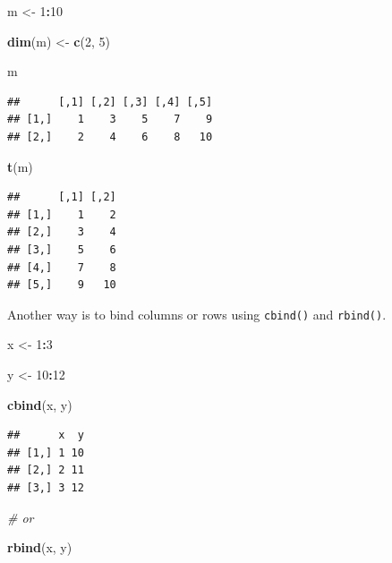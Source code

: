 \documentclass[
]{book}
\newenvironment{Shaded}{\begin{snugshade}}{\end{snugshade}}
\newcommand{\CommentTok}[1]{\textcolor[rgb]{0.56,0.35,0.01}{\textit{#1}}}
\newcommand{\DecValTok}[1]{\textcolor[rgb]{0.00,0.00,0.81}{#1}}
\newcommand{\FunctionTok}[1]{\textcolor[rgb]{0.13,0.29,0.53}{\textbf{#1}}}
\newcommand{\NormalTok}[1]{#1}
\newcommand{\OtherTok}[1]{\textcolor[rgb]{0.56,0.35,0.01}{#1}}
\newcommand{\SpecialCharTok}[1]{\textcolor[rgb]{0.81,0.36,0.00}{\textbf{#1}}}
\begin{document}
\begin{Shaded}
\begin{Highlighting}[]
\NormalTok{m }\OtherTok{\textless{}{-}} \DecValTok{1}\SpecialCharTok{:}\DecValTok{10}

\FunctionTok{dim}\NormalTok{(m) }\OtherTok{\textless{}{-}} \FunctionTok{c}\NormalTok{(}\DecValTok{2}\NormalTok{, }\DecValTok{5}\NormalTok{)}

\NormalTok{m}
\end{Highlighting}
\end{Shaded}

\begin{verbatim}
##      [,1] [,2] [,3] [,4] [,5]
## [1,]    1    3    5    7    9
## [2,]    2    4    6    8   10
\end{verbatim}

\begin{Shaded}
\begin{Highlighting}[]
\FunctionTok{t}\NormalTok{(m)}
\end{Highlighting}
\end{Shaded}

\begin{verbatim}
##      [,1] [,2]
## [1,]    1    2
## [2,]    3    4
## [3,]    5    6
## [4,]    7    8
## [5,]    9   10
\end{verbatim}

Another way is to bind columns or rows using \texttt{cbind()} and \texttt{rbind()}.

\begin{Shaded}
\begin{Highlighting}[]
\NormalTok{x }\OtherTok{\textless{}{-}} \DecValTok{1}\SpecialCharTok{:}\DecValTok{3}

\NormalTok{y }\OtherTok{\textless{}{-}} \DecValTok{10}\SpecialCharTok{:}\DecValTok{12}

\FunctionTok{cbind}\NormalTok{(x, y)}
\end{Highlighting}
\end{Shaded}

\begin{verbatim}
##      x  y
## [1,] 1 10
## [2,] 2 11
## [3,] 3 12
\end{verbatim}

\begin{Shaded}
\begin{Highlighting}[]
\CommentTok{\# or}

\FunctionTok{rbind}\NormalTok{(x, y)}
\end{Highlighting}
\end{Shaded}
\end{document}

